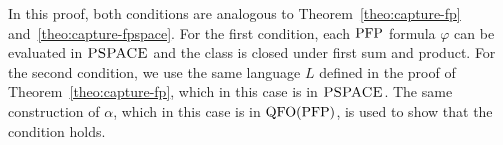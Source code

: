 In this proof, both conditions are analogous to Theorem~\ref{theo:capture-fp} and~\ref{theo:capture-fpspace}. For the first condition, each ${\rm PFP}$ formula $\varphi$ can be evaluated in $\text{\sc PSPACE}$ and the class is closed under first sum and product. For the second condition, we use the same language $L$ defined in the proof of Theorem~\ref{theo:capture-fp}, which in this case is in $\text{\sc PSPACE}$. The same construction of $\alpha$, which in this case is in ${\rm QFO}({\rm PFP})$, is used to show that the condition holds.
